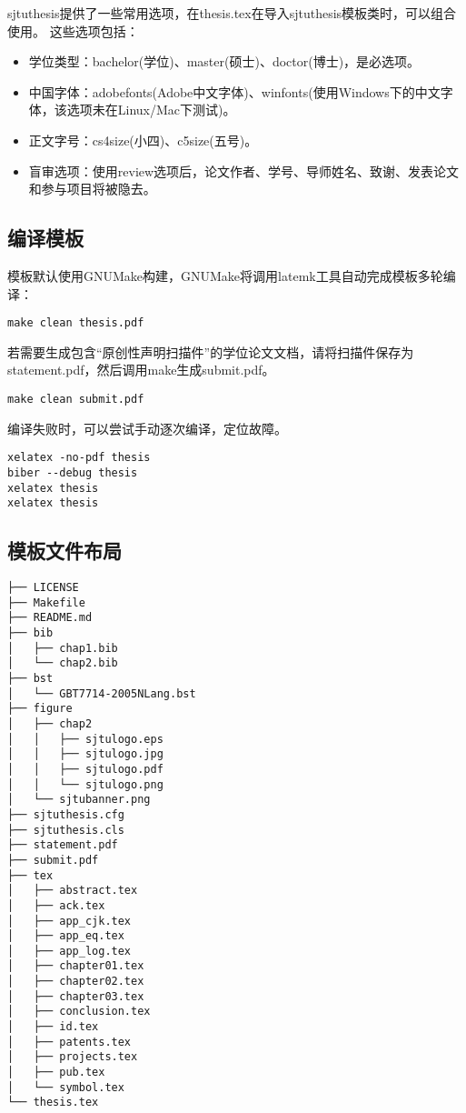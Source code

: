 sjtuthesis提供了一些常用选项，在thesis.tex在导入sjtuthesis模板类时，可以组合使用。
这些选项包括：

\begin{itemize}[noitemsep,topsep=0pt,parsep=0pt,partopsep=0pt]
\item 学位类型：bachelor(学位)、master(硕士)、doctor(博士)，是必选项。
\item 中国字体：adobefonts(Adobe中文字体)、winfonts(使用Windows下的中文字体，该选项未在Linux/Mac下测试)。
\item 正文字号：cs4size(小四)、c5size(五号)。
\item 盲审选项：使用review选项后，论文作者、学号、导师姓名、致谢、发表论文和参与项目将被隐去。
\end{itemize}

\subsection{编译模板}
\label{sec:process}

模板默认使用GNUMake构建，GNUMake将调用latemk工具自动完成模板多轮编译：

\begin{lstlisting}[basicstyle=\small\ttfamily, caption={编译模板}, numbers=none]
make clean thesis.pdf
\end{lstlisting}

若需要生成包含“原创性声明扫描件”的学位论文文档，请将扫描件保存为statement.pdf，然后调用make生成submit.pdf。

\begin{lstlisting}[basicstyle=\small\ttfamily, caption={生成用于提交的学位论文}, numbers=none]
make clean submit.pdf
\end{lstlisting}

编译失败时，可以尝试手动逐次编译，定位故障。

\begin{lstlisting}[basicstyle=\small\ttfamily, caption={手动逐次编译}, numbers=none]
xelatex -no-pdf thesis
biber --debug thesis
xelatex thesis
xelatex thesis
\end{lstlisting}

\subsection{模板文件布局}
\label{sec:layout}

\begin{lstlisting}[basicstyle=\small\ttfamily,caption={模板文件布局},label=layout,float,numbers=none]
├── LICENSE
├── Makefile
├── README.md
├── bib
│   ├── chap1.bib
│   └── chap2.bib
├── bst
│   └── GBT7714-2005NLang.bst
├── figure
│   ├── chap2
│   │   ├── sjtulogo.eps
│   │   ├── sjtulogo.jpg
│   │   ├── sjtulogo.pdf
│   │   └── sjtulogo.png
│   └── sjtubanner.png
├── sjtuthesis.cfg
├── sjtuthesis.cls
├── statement.pdf
├── submit.pdf
├── tex
│   ├── abstract.tex
│   ├── ack.tex
│   ├── app_cjk.tex
│   ├── app_eq.tex
│   ├── app_log.tex
│   ├── chapter01.tex
│   ├── chapter02.tex
│   ├── chapter03.tex
│   ├── conclusion.tex
│   ├── id.tex
│   ├── patents.tex
│   ├── projects.tex
│   ├── pub.tex
│   └── symbol.tex
└── thesis.tex
\end{lstlisting}

